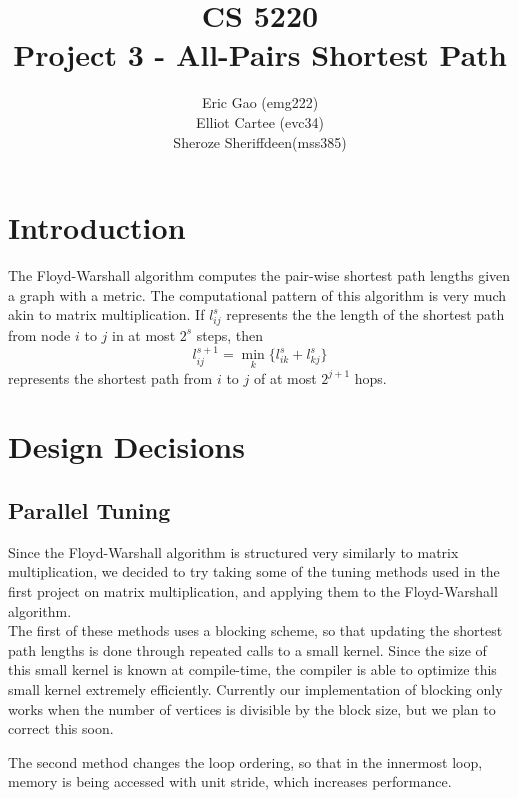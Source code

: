 \documentclass[11pt]{article}
\begin{document}
\title{CS 5220\\ Project 3 - All-Pairs Shortest Path}
\author{Eric Gao (emg222)\\ Elliot Cartee (evc34)\\ Sheroze Sheriffdeen(mss385)}
\maketitle

\section{Introduction}
The Floyd-Warshall algorithm computes the pair-wise shortest path lengths given a graph with a metric. The computational pattern of this algorithm is very much akin to matrix multiplication. If $l_{ij}^s$ represents the the length of the shortest path from node $i$ to $j$ in at most $2^s$ steps, then
\begin{equation}
	l_{ij}^{s+1} = \min_k \{ l_{ik}^s + l_{kj}^s \}
\end{equation} 
 represents the shortest path from $i$ to $j$ of at most $2^{j+1}$ hops. \cite{writeup} 
\section{Design Decisions}
 
\subsection{Parallel Tuning}

Since the Floyd-Warshall algorithm is structured very similarly to matrix multiplication, we decided to try taking some of the tuning methods used in the first project on matrix multiplication, and applying them to the Floyd-Warshall algorithm. \\

The first of these methods uses a blocking scheme, so that updating the shortest path lengths is done through repeated calls to a small kernel. Since the size of this small kernel is known at compile-time, the compiler is able to optimize this small kernel extremely efficiently. Currently our implementation of blocking only works when the number of vertices is divisible by the block size, but we plan to correct this soon.

The second method changes the loop ordering, so that in the innermost loop, memory is being accessed with unit stride, which increases performance.
\end{document}
